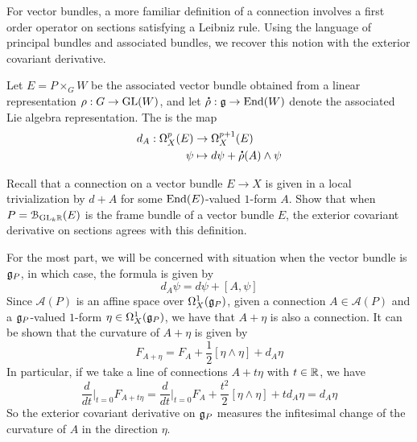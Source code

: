%
For vector bundles, a more familiar definition of a connection involves
a first order operator on sections satisfying a Leibniz rule. Using
the language of principal bundles and associated bundles, we recover
this notion with the exterior covariant derivative.
%
\begin{defn}
Let $E = P\times_G W$ be the associated vector bundle obtained from a
linear representation $\rho : G \to \mathrm{GL}(W)$, and let $\accentset{\mbox{\large\bfseries .}}{\rho} : \mathfrak{g} \to \operatorname{End}(W)$
denote the associated Lie algebra representation. The 
is the map
\begin{align*}
d_A : \Omega^p_X(E) &\to \Omega^{p+1}_X(E) \\
\psi &\mapsto d\psi + \accentset{\mbox{\large\bfseries .}}{\rho}(A) \wedge \psi
\end{align*}
\end{defn}
%
\begin{exer}
Recall that a connection on a vector bundle $E \to X$ is given in a local
trivialization by $d + A$ for some $\operatorname{End}(E)$-valued $1$-form $A$.
Show that when $P = \mathcal{B}_{\mathrm{GL}_k\mathbb{R}}(E)$ is the frame bundle of a vector
bundle $E$, the exterior covariant derivative on sections agrees with
this definition.
\end{exer}
%
For the most part, we will be concerned with situation when the vector
bundle is $\mathfrak{g}_P$, in which case, the formula is given by
\[
d_A\psi = d\psi + [A,\psi]
\]
Since $\mathscr{A}(P)$ is an affine space over $\Omega^1_X(\mathfrak{g}_P)$, given
a connection $A \in \mathscr{A}(P)$ and a $\mathfrak{g}_P$-valued $1$-form
$\eta \in \Omega^1_X(\mathfrak{g}_P)$, we have that $A + \eta$ is also a connection.
It can be shown that the curvature of $A+\eta$ is given by
\[
F_{A + \eta} = F_A + \frac{1}{2}[\eta\wedge\eta] + d_A\eta
\]
In particular, if we take a line of connections $A + t\eta$ with $t \in \mathbb{R}$,
we have
\[
\frac{d}{dt}\bigg\vert_{t=0}F_{A+t\eta}
= \frac{d}{dt}\bigg\vert_{t=0}F_A + \frac{t^2}{2}[\eta\wedge\eta] + td_A\eta
= d_A\eta
\]
So the exterior covariant derivative on $\mathfrak{g}_P$ measures the infitesimal
change of the curvature of $A$ in the direction $\eta$.
%